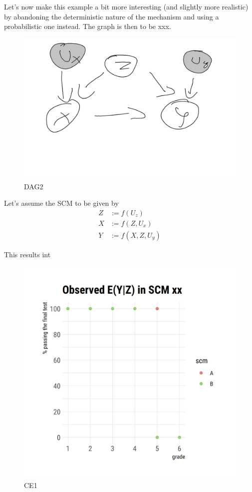 \documentclass[
]{book}
\theoremstyle{definition}
\theoremstyle{definition}
\theoremstyle{definition}
\theoremstyle{remark}
\begin{document}
Let's now make this example a bit more interesting (and slightly more realistic) by abandoning the deterministic nature of the mechanism and using a probabilistic one instead. The graph is then to be xxx.

\begin{figure}
\centering
\includegraphics{images/dag_exmpl_tut2.png}
\caption{DAG2}
\end{figure}

Let's assume the SCM to be given by
\begin{align}
Z &:= f(U_z) \\
X &:= f(Z, U_x) \\
Y &:= f(X, Z, U_y)
\end{align}

This results int

\begin{figure}
\centering
\includegraphics{images/test.png}
\caption{CE1}
\end{figure}
\end{document}
